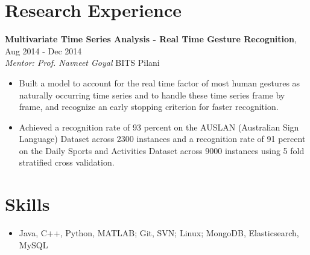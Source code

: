 \documentclass[letterpaper]{article}
\begin{document}
\section*{Research Experience}
\textbf{Multivariate Time Series Analysis - Real Time Gesture Recognition},  \hfill
Aug 2014 - Dec 2014
\\ \emph{Mentor: Prof. Navneet Goyal} \hfill
BITS Pilani\\
\vspace{-6mm}
\begin{itemize}
\item Built a model to account for the real time factor of most human gestures as naturally occurring time series and to handle these time series frame by frame, and recognize an early stopping criterion for faster recognition. 
\vspace{-2mm}
\item Achieved a recognition rate of 93 percent on the AUSLAN (Australian Sign Language) Dataset across 2300 instances and a recognition rate of 91 percent on the Daily Sports and Activities Dataset across 9000 instances using 5 fold stratified cross validation.
\end{itemize}

\section*{Skills}
\begin{itemize}
\item Java, C++, Python, MATLAB; Git, SVN; Linux; MongoDB, Elasticsearch, MySQL
\end{itemize}
\end{document}
